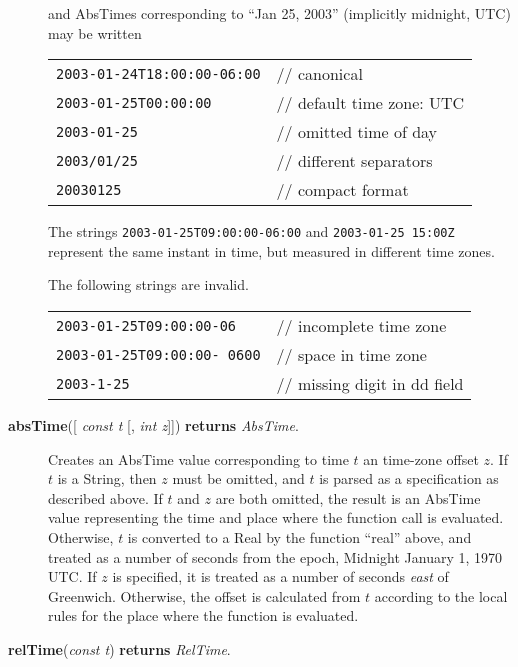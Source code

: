 \documentclass{article}
\begin{document}
\begin{description}
and AbsTimes corresponding to ``Jan 25, 2003'' (implicitly midnight, UTC) may
be written

\begin{tabular}{ll}
\verb/2003-01-24T18:00:00-06:00/ & // canonical \\
\verb/2003-01-25T00:00:00/       & // default time zone: UTC \\
\verb/2003-01-25/                & // omitted time of day \\
\verb|2003/01/25|                & // different separators \\
\verb/20030125/                  & // compact format
\end{tabular}

The strings \verb/2003-01-25T09:00:00-06:00/ and \verb/2003-01-25 15:00Z/
represent the same instant in time, but measured in different time zones.

The following strings are invalid.

\begin{tabular}{ll}
\verb/2003-01-25T09:00:00-06/    & // incomplete time zone \\
\verb/2003-01-25T09:00:00- 0600/ & // space in time zone \\
\verb/2003-1-25/                 & // missing digit in dd field
\end{tabular}


\item[\textbf{absTime}({[} \emph{const t} {[}, \emph{int z}{]}{]})
\textbf{returns} \emph{AbsTime}.]

Creates an AbsTime value corresponding to time $t$ an time-zone offset $z$.
If $t$ is a String, then $z$ must be omitted, and $t$ is parsed as a
specification as described above.  If $t$ and $z$ are both omitted, the
result is an AbsTime value representing the time and place where the function
call is evaluated.
Otherwise, $t$ is converted to a Real by the function ``real'' above,
and treated as a number of seconds from the epoch, Midnight January 1, 1970
UTC.  If $z$ is specified, it is treated as a number of seconds \emph{east}
of Greenwich.  Otherwise, the offset is calculated from $t$ according to
the local rules for the place where the function is evaluated.

\item[\textbf{relTime}(\emph{const t}) \textbf{returns} \emph{RelTime}.]


\end{description}
\end{document}
